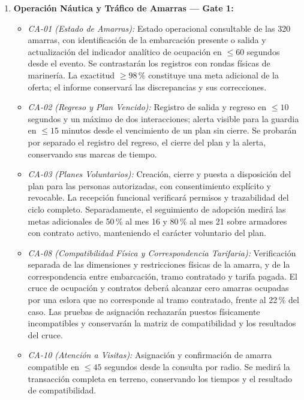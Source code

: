 \begin{enumerate}
    \item \textbf{Operación Náutica y Tráfico de Amarras --- Gate 1:}
    \begin{itemize}
        \item \emph{CA-01 (Estado de Amarras):} Estado operacional consultable de las 320 amarras, con identificación de la embarcación presente o salida y actualización del indicador analítico de ocupación en $\le 60$ segundos desde el evento. Se contrastarán los registros con rondas físicas de marinería. La exactitud $\ge 98\,\%$ constituye una meta adicional de la oferta; el informe conservará las discrepancias y sus correcciones.

        \item \emph{CA-02 (Regreso y Plan Vencido):} Registro de salida y regreso en $\le 10$ segundos y un máximo de dos interacciones; alerta visible para la guardia en $\le 15$ minutos desde el vencimiento de un plan sin cierre. Se probarán por separado el registro del regreso, el cierre del plan y la alerta, conservando sus marcas de tiempo.

        \item \emph{CA-03 (Planes Voluntarios):} Creación, cierre y puesta a disposición del plan para las personas autorizadas, con consentimiento explícito y revocable. La recepción funcional verificará permisos y trazabilidad del ciclo completo. Separadamente, el seguimiento de adopción medirá las metas adicionales de 50\,\% al mes 16 y 80\,\% al mes 21 sobre armadores con contrato activo, manteniendo el carácter voluntario del plan.

        \item \emph{CA-08 (Compatibilidad Física y Correspondencia Tarifaria):} Verificación separada de las dimensiones y restricciones físicas de la amarra, y de la correspondencia entre embarcación, tramo contratado y tarifa pagada. El cruce de ocupación y contratos deberá alcanzar cero amarras ocupadas por una eslora que no corresponde al tramo contratado, frente al 22\,\% del caso. Las pruebas de asignación rechazarán puestos físicamente incompatibles y conservarán la matriz de compatibilidad y los resultados del cruce.

        \item \emph{CA-10 (Atención a Visitas):} Asignación y confirmación de amarra compatible en $\le 45$ segundos desde la consulta por radio. Se medirá la transacción completa en terreno, conservando los tiempos y el resultado de compatibilidad.


\end{itemize}
\end{enumerate}
